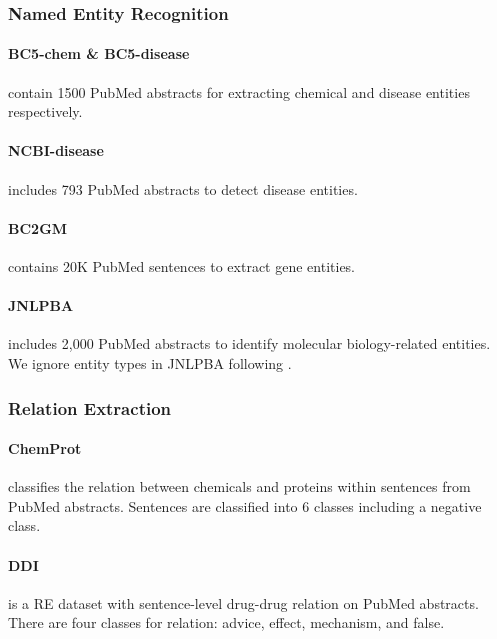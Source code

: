 \documentclass[11pt]{article}
\begin{document}
\subsubsection{Named Entity Recognition}
\paragraph{BC5-chem \& BC5-disease} \cite{li2016biocreative} contain 1500 PubMed abstracts for extracting chemical and disease entities respectively.

\paragraph{NCBI-disease} \cite{dougan2014ncbi} includes 793 PubMed abstracts to detect disease entities.

\paragraph{BC2GM} \cite{smith2008overview} contains 20K PubMed sentences to extract gene entities.

\paragraph{JNLPBA} \cite{collier-kim-2004-introduction} includes 2,000 PubMed abstracts to identify molecular biology-related entities.
We ignore entity types in JNLPBA following \citet{gu2020domain}.

\subsubsection{Relation Extraction}

\paragraph{ChemProt} \cite{krallinger2017overview} classifies the relation between chemicals and proteins within sentences from PubMed abstracts.
Sentences are classified into 6 classes including a negative class.

\paragraph{DDI} \cite{herrero2013ddi} is a RE dataset with sentence-level drug-drug relation on PubMed abstracts.
There are four classes for relation: advice, effect, mechanism, and false.
\end{document}
